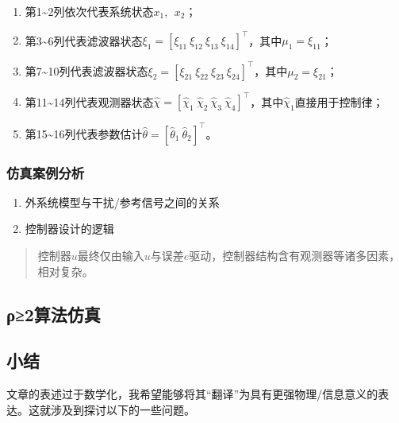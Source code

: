 \documentclass[
  12pt,
  a4paper
]{article}
\begin{document}
\begin{enumerate}
\def\labelenumi{\arabic{enumi}.}
\item
  第1\textasciitilde2列依次代表系统状态\(x_{1},\ \ x_{2}\)；
\item
  第3\textasciitilde6列代表滤波器状态\(\xi_{1} = \left\lbrack \xi_{11}\ \xi_{12}\ \xi_{13}\ \xi_{14} \right\rbrack^{\top}\)，其中\(\mu_{1} = \xi_{11}\)；
\item
  第7\textasciitilde10列代表滤波器状态\(\xi_{2} = \left\lbrack \xi_{21}\ \xi_{22}\ \xi_{23}\ \xi_{24} \right\rbrack^{\top}\)，其中\(\mu_{2} = \xi_{21}\)；
\item
  第11\textasciitilde14列代表观测器状态\(\widehat{\chi} = \left\lbrack {\widehat{\chi}}_{1}\ {\widehat{\chi}}_{2}\ {\widehat{\chi}}_{3}\ {\widehat{\chi}}_{4} \right\rbrack^{\top}\)，其中\({\widehat{\chi}}_{1}\)直接用于控制律；
\item
  第15\textasciitilde16列代表参数估计\(\widehat{\theta} = \left\lbrack {\widehat{\theta}}_{1}\ {\widehat{\theta}}_{2} \right\rbrack^{\top}\)。
\end{enumerate}

\subsubsection{仿真案例分析}\label{ux4effux771fux6848ux4f8bux5206ux6790}

\begin{enumerate}
\def\labelenumi{\arabic{enumi}.}
\item
  外系统模型与干扰/参考信号之间的关系
\item
  控制器设计的逻辑
\end{enumerate}

\begin{quote}
控制器\(u\)最终仅由输入\(u\)与误差\(e\)驱动，控制器结构含有观测器等诸多因素，相对复杂。
\end{quote}

\subsection{ρ≥2算法仿真}\label{ux3c12ux7b97ux6cd5ux4effux771f}

\subsection{小结}\label{ux5c0fux7ed3}

文章的表述过于数学化，我希望能够将其``翻译''为具有更强物理/信息意义的表达。这就涉及到探讨以下的一些问题。
\end{document}
